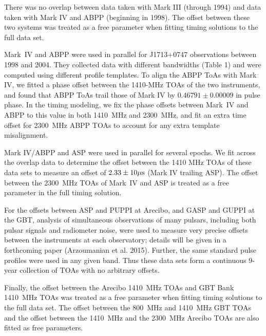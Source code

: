 There was no overlap between data taken with Mark III (through 1994) and
data taken with Mark IV and ABPP (beginning in 1998).  The offset between
these two systems was treated as a free parameter when fitting timing
solutions to the full data set.

Mark~IV and ABPP were used in parallel for J1713+0747 observations between
1998 and 2004. They collected data with different bandwidths (Table 1) and
were computed using different profile templates. To align the ABPP ToAs
with Mark IV, we fitted a phase offset between the 1410-MHz TOAs of the
two instruments, and found that ABPP ToAs trail those of Mark IV
by $0.46791\pm0.00009$ in pulse phase. In the timing modeling, we fix
the phase offsets between Mark~IV and ABPP to this value in
both 1410~MHz and 2300~MHz, and fit an extra time offset for 2300~MHz ABPP 
TOAs to account for any extra template misalignment.


Mark IV/ABPP and ASP were used in parallel for several epochs.  We fit
across the overlap data to determine the offset between the 1410 MHz
TOAs of these data sets to measure an offset of $2.33\pm10\mu{\rm s}$
(Mark IV trailing ASP). The offset between the 2300~MHz TOAs of Mark~IV 
and ASP is treated as a free parameter in the full timing solution.

For the offsets between ASP and PUPPI at Arecibo, and GASP and GUPPI
at the GBT, analysis of simultaneous observations of many pulsars,
including both pulsar signals and radiometer noise, were used to
measure very precise offsets between the instruments at each
observatory; details will be given in a forthcoming paper (Arzoumanian
et al. 2015).  Further, the same standard pulse profiles were used in
any given band.  Thus these data sets form a continuous 9-year
collection of TOAs with no arbitrary offsets.

Finally, the offset between the Arecibo 1410~MHz TOAs and GBT Bank 1410~MHz TOAs 
 was treated as a free parameter when fitting timing solutions to the full data set.  
The offset between the 800~MHz and 1410~MHz GBT TOAs and the offset between
the 1410~MHz and the 2300~MHz Arecibo TOAs are also fitted as free
parameters.  



